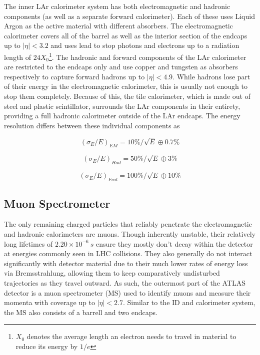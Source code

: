 The inner LAr calorimeter system has both electromagnetic and hadronic components (as well as a separate forward 
calorimeter). Each of these uses Liquid Argon as the active material with different absorbers. The electromagnetic 
calorimeter covers all of the barrel as well as the interior section of the endcaps up to $|\eta| < 3.2$ and uses lead 
to stop photons and electrons up to a radiation length of $24X_0$\footnote{$X_0$ denotes the average length an electron 
needs to travel in material to reduce its energy by $1/e$}. The hadronic and forward components of the LAr calorimeter are 
restricted to the endcaps only and use copper and tungsten as absorbers respectively to capture forward hadrons up to 
$|\eta| < 4.9$. While hadrons lose part of their energy in the electromagnetic calorimeter, this is usually not enough 
to stop them completely. Because of this, the tile calorimeter, which is made out of steel and plastic scintillator, 
surrounds the LAr components in their entirety, providing a full hadronic calorimeter outside of the LAr endcaps. The 
energy resolution differs between these individual components as

\begin{equation} %
(\sigma_{E}/E)_{EM} = 10\% / \sqrt{E} \oplus 0.7\%
\end{equation}

\begin{equation} %
(\sigma_{E}/E)_{Had} = 50\% / \sqrt{E} \oplus 3\%
\end{equation}

\begin{equation} %
(\sigma_{E}/E)_{Fwd} = 100\% / \sqrt{E} \oplus 10\%
\end{equation}

\subsection{Muon Spectrometer}

The only remaining charged particles that reliably penetrate the electromagnetic and hadronic calorimeters are muons. 
Though inherently unstable, their relatively long lifetimes of $2.20\times10^{-6}\ s$ ensure they mostly don't decay 
within the detector at energies commonly seen in LHC collisions. They also generally do not interact significantly 
with detector material due to their much lower rates of energy loss via Bremsstrahlung, allowing them to keep 
comparatively undisturbed trajectories as they travel outward. As such, the outermost part of the ATLAS detector is a 
muon spectrometer (MS) used to identify muons and measure their momenta with coverage up to $|\eta| < 2.7$. Similar to 
the ID and calorimeter system, the MS also consists of a barrell and two endcaps. \par

